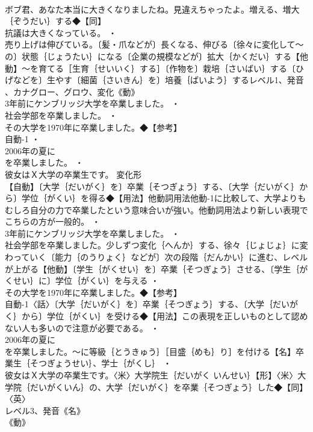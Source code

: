 \documentclass[8pt]{extreport}
\begin{document}
\begin{CJK}{UTF8}{min}
\\	ボブ君、あなた本当に大きくなりましたね。見違えちゃったよ。増える、増大｛ぞうだい｝する◆【同】
\\	抗議は大きくなっている。 ・
\\	売り上げは伸びている。〔髪・爪などが〕長くなる、伸びる〔徐々に変化して～の〕状態｛じょうたい｝になる〔企業の規模などが〕拡大｛かくだい｝する【他動】～を育てる［生育｛せいいく｝する］〔作物を〕栽培｛さいばい｝する〔ひげなどを〕生やす〔細菌｛さいきん｝を〕培養｛ばいよう｝するレベル1、発音
\\	、カナグロー、グロウ、変化《動》
\\	3年前にケンブリッジ大学を卒業しました。 ・
\\	社会学部を卒業しました。 ・
\\	その大学を1970年に卒業しました。◆【参考】
\\	{自動-1} ・
\\	2006年の夏に
\\	を卒業しました。 ・
\\	彼女はＸ大学の卒業生です。	変化形 
\\	【自動】〔大学｛だいがく｝を〕卒業｛そつぎょう｝する、〔大学｛だいがく｝から〕学位｛がくい｝を得る◆【用法】他動詞用法{他動-1}に比較して、大学よりもむしろ自分の力で卒業したという意味合いが強い。他動詞用法より新しい表現でこちらの方が一般的。 ・
\\	3年前にケンブリッジ大学を卒業しました。 ・
\\	社会学部を卒業しました。少しずつ変化｛へんか｝する、徐々｛じょじょ｝に変わっていく〔能力｛のうりょく｝などが〕次の段階｛だんかい｝に進む、レベルが上がる【他動】〔学生｛がくせい｝を〕卒業｛そつぎょう｝させる、〔学生｛がくせい｝に〕学位｛がくい｝を与える ・
\\	その大学を1970年に卒業しました。◆【参考】
\\	{自動-1}〈話〉〔大学｛だいがく｝を〕卒業｛そつぎょう｝する、〔大学｛だいがく｝から〕学位｛がくい｝を受ける◆【用法】この表現を正しいものとして認めない人も多いので注意が必要である。 ・
\\	2006年の夏に
\\	を卒業しました。～に等級｛とうきゅう｝［目盛｛めも｝り］を付ける【名】卒業生｛そつぎょうせい｝、学士｛がくし｝ ・
\\	彼女はＸ大学の卒業生です。〈米〉大学院生｛だいがく いんせい｝【形】〈米〉大学院｛だいがくいん｝の、大学｛だいがく｝を卒業｛そつぎょう｝した◆【同】〈英〉
\\	レベル3、発音《名》
\\	《動》

\end{CJK}
\end{document}
